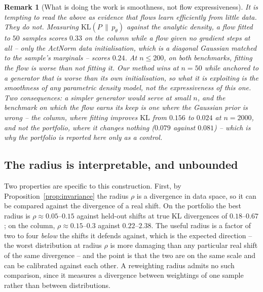 \documentclass[11pt]{article}
\newtheorem{remark}{Remark}
\begin{document}
\begin{remark}[What is doing the work is smoothness, not flow expressiveness]
\label{rem:prior}
It is tempting to read the above as evidence that flows learn efficiently from little
data. They do not. Measuring $\mathrm{KL}(P \,\|\, p_\theta)$ against the analytic density,
a flow fitted to $50$ samples scores $0.33$ on the column while a flow given \emph{no gradient
steps at all} -- only the ActNorm data initialisation, which is a diagonal Gaussian matched
to the sample's marginals -- scores $0.24$. At $n \le 200$, on both benchmarks, fitting the
flow is worse than not fitting it. Our method wins at $n=50$ while anchored to a generator
that is worse than its own initialisation, so what it is exploiting is the smoothness of
\emph{any} parametric density model, not the expressiveness of this one. Two consequences:
a simpler generator would serve at small $n$, and the benchmark on which the flow earns its
keep is one where the Gaussian prior is wrong -- the column, where fitting improves
$\mathrm{KL}$ from $0.156$ to $0.024$ at $n=2000$, and not the portfolio, where it changes
nothing ($0.079$ against $0.081$) -- which is why the portfolio is reported here only as a
control.
\end{remark}

\subsection{The radius is interpretable, and unbounded}
\label{sec:radius}

Two properties are specific to this construction. First, by
Proposition~\ref{prop:invariance} the radius $\rho$ is a divergence in data space, so it can
be compared against the divergence of a real shift. On the portfolio the best radius is
$\rho\approx0.05$--$0.15$ against held-out shifts at true KL divergences of $0.18$--$0.67$;
on the column, $\rho\approx0.15$--$0.3$ against $0.22$--$2.38$. The useful radius is a
factor of two to four \emph{below} the shifts it defends against, which is the expected
direction -- the worst distribution at radius $\rho$ is more damaging than any particular
real shift of the same divergence -- and the point is that the two are on the same scale and
can be calibrated against each other. A reweighting radius admits no such comparison, since
it measures a divergence between weightings of one sample rather than between
distributions.
\end{document}
